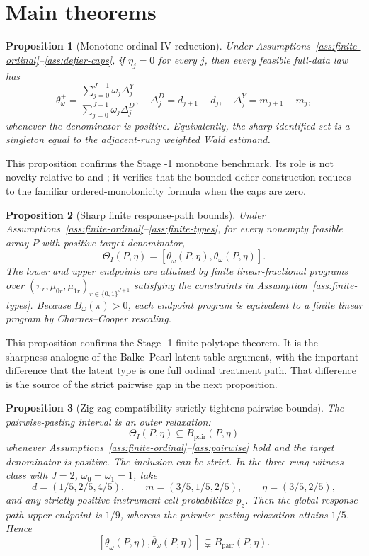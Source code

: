 \documentclass[11pt]{article}
\theoremstyle{definition}
\theoremstyle{plain}
\newtheorem{proposition}{Proposition}
\theoremstyle{remark}
\begin{document}
\section{Main theorems}
\begin{proposition}[Monotone ordinal-IV reduction]\label{prop:monotone-reduction}
Under Assumptions~\ref{ass:finite-ordinal}--\ref{ass:defier-caps}, if
\(\eta_j=0\) for every \(j\), then every feasible full-data law has
\[
\theta^+_\omega
=
\frac{\sum_{j=0}^{J-1}\omega_j\Delta^Y_j}
     {\sum_{j=0}^{J-1}\omega_j\Delta^D_j},
\quad
\Delta^D_j=d_{j+1}-d_j,\quad
\Delta^Y_j=m_{j+1}-m_j,
\]
whenever the denominator is positive.  Equivalently, the sharp identified set
is a singleton equal to the adjacent-rung weighted Wald estimand.
\end{proposition}

This proposition confirms the Stage -1 monotone benchmark.  Its role is not
novelty relative to \cite{ImbensAngrist1994} and \cite{AngristImbens1995};
it verifies that the bounded-defier construction reduces to the familiar
ordered-monotonicity formula when the caps are zero.

\begin{proposition}[Sharp finite response-path bounds]\label{prop:finite-polytope}
Under Assumptions~\ref{ass:finite-ordinal}--\ref{ass:finite-types}, for every
nonempty feasible array \(P\) with positive target denominator,
\[
\Theta_I(P,\eta)
=
[\underline\theta_\omega(P,\eta),\overline\theta_\omega(P,\eta)].
\]
The lower and upper endpoints are attained by finite linear-fractional
programs over \((\pi_r,\mu_{0r},\mu_{1r})_{r\in\{0,1\}^{J+1}}\) satisfying the
constraints in Assumption~\ref{ass:finite-types}.  Because
\(B_\omega(\pi)>0\), each endpoint program is equivalent to a finite linear
program by Charnes--Cooper rescaling.
\end{proposition}

This proposition confirms the Stage -1 finite-polytope theorem.  It is the
sharpness analogue of the Balke--Pearl latent-table argument, with the
important difference that the latent type is one full ordinal treatment path.
That difference is the source of the strict pairwise gap in the next
proposition.

\begin{proposition}[Zig-zag compatibility strictly tightens pairwise bounds]\label{prop:zigzag-strict}
The pairwise-pasting interval is an outer relaxation:
\[
\Theta_I(P,\eta)\subseteq B_{\mathrm{pair}}(P,\eta)
\]
whenever Assumptions~\ref{ass:finite-ordinal}--\ref{ass:pairwise} hold and
the target denominator is positive.  The inclusion can be strict.  In the
three-rung witness class with \(J=2\), \(\omega_0=\omega_1=1\), take
\[
d=(1/5,2/5,4/5),\qquad
m=(3/5,1/5,2/5),\qquad
\eta=(3/5,2/5),
\]
and any strictly positive instrument cell probabilities \(p_z\).  Then the
global response-path upper endpoint is \(1/9\), whereas the pairwise-pasting
relaxation attains \(1/5\).  Hence
\[
[\underline\theta_\omega(P,\eta),\overline\theta_\omega(P,\eta)]
\subsetneq B_{\mathrm{pair}}(P,\eta).
\]
\end{proposition}
\end{document}
